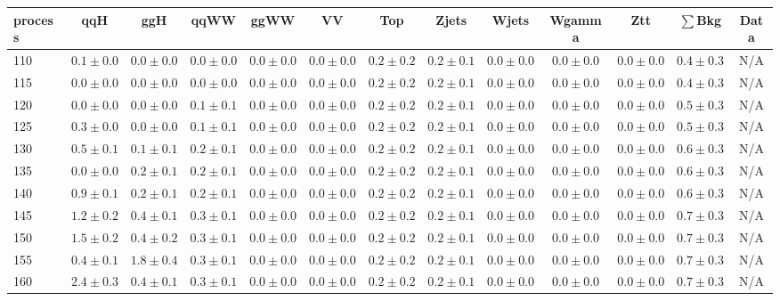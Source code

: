 \begin{table}
{%
 \tiny
 \begin{center}
 \begin{tabular}{l | c c | c c c c c c c c  | c c}
 \hline
 process & qqH & ggH & qqWW & ggWW & VV & Top & Zjets & Wjets & Wgamma & Ztt & $\sum$Bkg & Data \\
 \hline
110 & $0.1\pm0.0$ & $0.0\pm0.0$ & $0.0\pm0.0$ & $0.0\pm0.0$ & $0.0\pm0.0$ & $0.2\pm0.2$ & $0.2\pm0.1$ & $0.0\pm0.0$ & $0.0\pm0.0$ & $0.0\pm0.0$ & $0.4\pm0.3$ & N/A \\
115 & $0.0\pm0.0$ & $0.0\pm0.0$ & $0.0\pm0.0$ & $0.0\pm0.0$ & $0.0\pm0.0$ & $0.2\pm0.2$ & $0.2\pm0.1$ & $0.0\pm0.0$ & $0.0\pm0.0$ & $0.0\pm0.0$ & $0.4\pm0.3$ & N/A \\
120 & $0.0\pm0.0$ & $0.0\pm0.0$ & $0.1\pm0.1$ & $0.0\pm0.0$ & $0.0\pm0.0$ & $0.2\pm0.2$ & $0.2\pm0.1$ & $0.0\pm0.0$ & $0.0\pm0.0$ & $0.0\pm0.0$ & $0.5\pm0.3$ & N/A \\
125 & $0.3\pm0.0$ & $0.0\pm0.0$ & $0.1\pm0.1$ & $0.0\pm0.0$ & $0.0\pm0.0$ & $0.2\pm0.2$ & $0.2\pm0.1$ & $0.0\pm0.0$ & $0.0\pm0.0$ & $0.0\pm0.0$ & $0.5\pm0.3$ & N/A \\
130 & $0.5\pm0.1$ & $0.1\pm0.1$ & $0.2\pm0.1$ & $0.0\pm0.0$ & $0.0\pm0.0$ & $0.2\pm0.2$ & $0.2\pm0.1$ & $0.0\pm0.0$ & $0.0\pm0.0$ & $0.0\pm0.0$ & $0.6\pm0.3$ & N/A \\
135 & $0.0\pm0.0$ & $0.2\pm0.1$ & $0.2\pm0.1$ & $0.0\pm0.0$ & $0.0\pm0.0$ & $0.2\pm0.2$ & $0.2\pm0.1$ & $0.0\pm0.0$ & $0.0\pm0.0$ & $0.0\pm0.0$ & $0.6\pm0.3$ & N/A \\
140 & $0.9\pm0.1$ & $0.2\pm0.1$ & $0.2\pm0.1$ & $0.0\pm0.0$ & $0.0\pm0.0$ & $0.2\pm0.2$ & $0.2\pm0.1$ & $0.0\pm0.0$ & $0.0\pm0.0$ & $0.0\pm0.0$ & $0.6\pm0.3$ & N/A \\
145 & $1.2\pm0.2$ & $0.4\pm0.1$ & $0.3\pm0.1$ & $0.0\pm0.0$ & $0.0\pm0.0$ & $0.2\pm0.2$ & $0.2\pm0.1$ & $0.0\pm0.0$ & $0.0\pm0.0$ & $0.0\pm0.0$ & $0.7\pm0.3$ & N/A \\
150 & $1.5\pm0.2$ & $0.4\pm0.2$ & $0.3\pm0.1$ & $0.0\pm0.0$ & $0.0\pm0.0$ & $0.2\pm0.2$ & $0.2\pm0.1$ & $0.0\pm0.0$ & $0.0\pm0.0$ & $0.0\pm0.0$ & $0.7\pm0.3$ & N/A \\
155 & $0.4\pm0.1$ & $1.8\pm0.4$ & $0.3\pm0.1$ & $0.0\pm0.0$ & $0.0\pm0.0$ & $0.2\pm0.2$ & $0.2\pm0.1$ & $0.0\pm0.0$ & $0.0\pm0.0$ & $0.0\pm0.0$ & $0.7\pm0.3$ & N/A \\
160 & $2.4\pm0.3$ & $0.4\pm0.1$ & $0.3\pm0.1$ & $0.0\pm0.0$ & $0.0\pm0.0$ & $0.2\pm0.2$ & $0.2\pm0.1$ & $0.0\pm0.0$ & $0.0\pm0.0$ & $0.0\pm0.0$ & $0.7\pm0.3$ & N/A \\

\end{tabular}
\end{center}}
\end{table}

